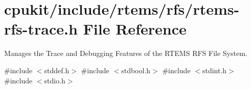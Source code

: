 \hypertarget{rtems-rfs-trace_8h}{}\section{cpukit/include/rtems/rfs/rtems-\/rfs-\/trace.h File Reference}
\label{rtems-rfs-trace_8h}


Manages the Trace and Debugging Features of the R\+T\+E\+MS R\+FS File System.  


{\ttfamily \#include $<$stddef.\+h$>$}\newline
{\ttfamily \#include $<$stdbool.\+h$>$}\newline
{\ttfamily \#include $<$stdint.\+h$>$}\newline
{\ttfamily \#include $<$stdio.\+h$>$}\newline
